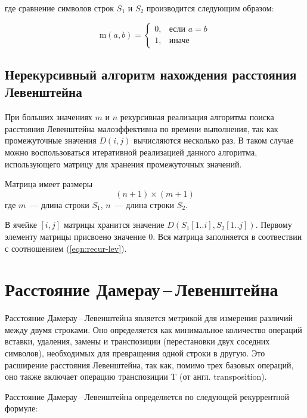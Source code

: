 \noindent где сравнение символов строк $S_1$ и $S_2$ производится следующим образом:

\begin{equation}
    \text{m}(a, b) = 
    \begin{cases}
        0, &\text{если $a = b$}\\
        1, &\text{иначе}
    \end{cases}
\end{equation}

\subsection{Нерекурсивный алгоритм нахождения рас\-стояния Левенштейна}
При больших значениях $m$ и $n$ рекурсивная реализация алгоритма поиска расстояния Левенштейна малоэффективна по времени выполнения, так как промежуточные значения $D(i, j)$ вычисляются несколько раз. В таком случае можно воспользоваться итеративной реализацией данного алгоритма, использующего матрицу для хранения промежуточных значений.

Матрица имеет размеры
\begin{equation}
(n + 1) \times (m + 1)
\end{equation}
\noindent где $m$~--- длина строки $S_1$, $n$~--- длина строки $S_2$.

В ячейке $[i, j]$ матрицы хранится значение $D(S_1[1..i], S_2[1..j])$. Пер\-вому элементу матрицы присвоено значение $0$. Вся матрица заполняется в соотвествии с соотношением (\ref{eqn:recur-lev}).

\section{\texorpdfstring{Расстояние Дамерау\,--\,Левенштейна}{}}

Расстояние Дамерау\,--\,Левенштейна является метрикой для измерения различий между двумя строками. Оно определяется как минимальное количество операций вставки, удаления, замены и транспозиции (перестановки двух соседних символов), необходимых для превращения одной строки в другую. Это расширение расстояния Левенштейна, так как, помимо трех базовых операций, оно также включает операцию транспозиции T (от англ. transposition).

Расстояние Дамерау\,--\,Левенштейна определяется по следующей рекуррентной формуле:

